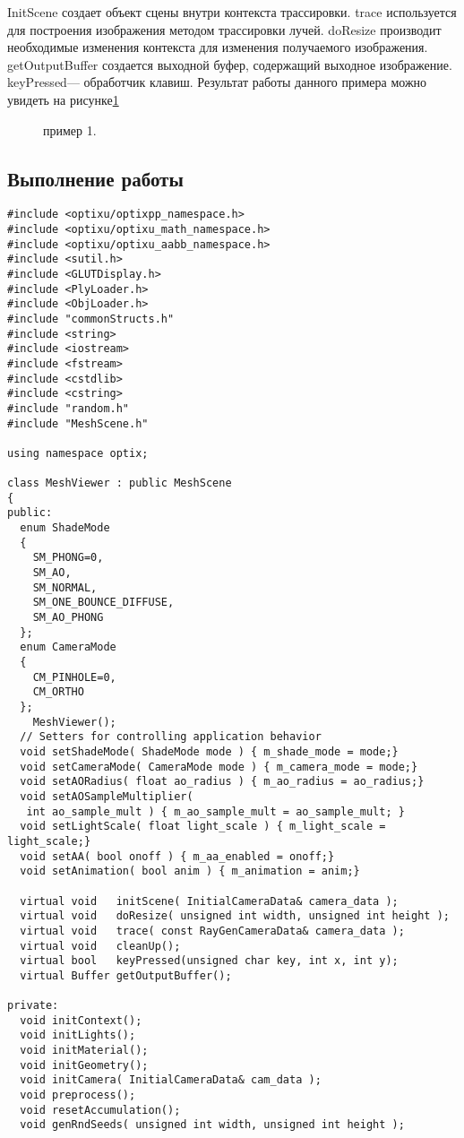  InitScene создает объект сцены внутри контекста трассировки. 
 trace используется для построения изображения методом трассировки лучей.
 doResize производит необходимые изменения контекста для изменения получаемого изображения.
 getOutputBuffer создается выходной буфер, содержащий выходное изображение.
  keyPressed--- обработчик клавиш.
  Результат работы данного примера можно увидеть на рисунке\ref{glass}
\begin{figure}[h!]
\caption{пример 1.}
\label{glass}
\end{figure}
 
\subsection{Выполнение работы}
\begin{verbatim}
#include <optixu/optixpp_namespace.h>
#include <optixu/optixu_math_namespace.h>
#include <optixu/optixu_aabb_namespace.h>
#include <sutil.h>
#include <GLUTDisplay.h>
#include <PlyLoader.h>
#include <ObjLoader.h>
#include "commonStructs.h"
#include <string>
#include <iostream>
#include <fstream>
#include <cstdlib>
#include <cstring>
#include "random.h"
#include "MeshScene.h"

using namespace optix;

class MeshViewer : public MeshScene
{
public:
  enum ShadeMode
  {
    SM_PHONG=0,
    SM_AO,
    SM_NORMAL,
    SM_ONE_BOUNCE_DIFFUSE,
    SM_AO_PHONG
  };
  enum CameraMode
  {
    CM_PINHOLE=0,
    CM_ORTHO
  };
    MeshViewer();
  // Setters for controlling application behavior
  void setShadeMode( ShadeMode mode ) { m_shade_mode = mode;}
  void setCameraMode( CameraMode mode ) { m_camera_mode = mode;}
  void setAORadius( float ao_radius ) { m_ao_radius = ao_radius;}
  void setAOSampleMultiplier(
   int ao_sample_mult ) { m_ao_sample_mult = ao_sample_mult; }
  void setLightScale( float light_scale ) { m_light_scale = light_scale;}
  void setAA( bool onoff ) { m_aa_enabled = onoff;}
  void setAnimation( bool anim ) { m_animation = anim;}

  virtual void   initScene( InitialCameraData& camera_data );
  virtual void   doResize( unsigned int width, unsigned int height );
  virtual void   trace( const RayGenCameraData& camera_data );
  virtual void   cleanUp();
  virtual bool   keyPressed(unsigned char key, int x, int y);
  virtual Buffer getOutputBuffer();

private:
  void initContext();
  void initLights();
  void initMaterial();
  void initGeometry();
  void initCamera( InitialCameraData& cam_data );
  void preprocess();
  void resetAccumulation();
  void genRndSeeds( unsigned int width, unsigned int height );


\end{verbatim}
